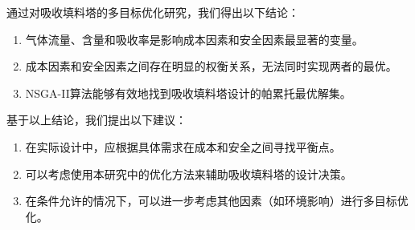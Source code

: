 通过对吸收填料塔的多目标优化研究，我们得出以下结论：

\begin{enumerate}
	\item 气体流量、含量和吸收率是影响成本因素和安全因素最显著的变量。
	\item 成本因素和安全因素之间存在明显的权衡关系，无法同时实现两者的最优。
	\item NSGA-II算法能够有效地找到吸收填料塔设计的帕累托最优解集。
\end{enumerate}

基于以上结论，我们提出以下建议：

\begin{enumerate}
	\item 在实际设计中，应根据具体需求在成本和安全之间寻找平衡点。
	\item 可以考虑使用本研究中的优化方法来辅助吸收填料塔的设计决策。
	\item 在条件允许的情况下，可以进一步考虑其他因素（如环境影响）进行多目标优化。
\end{enumerate}